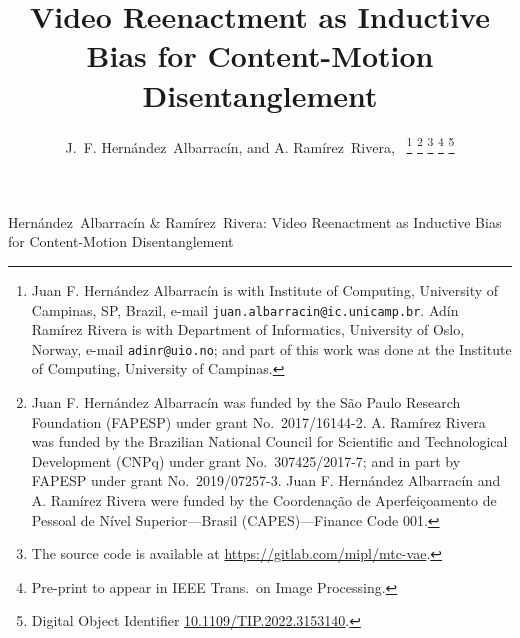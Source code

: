 \documentclass[journal]{IEEEtran}
\begin{document}
\title{Video Reenactment as Inductive Bias for Content-Motion Disentanglement}

\author{J.~F. Hernández~Albarracín,
        and A. Ramírez~Rivera,~%
\thanks{%
Juan F. Hernández Albarracín is with Institute of Computing, University of Campinas, SP, Brazil, e-mail \texttt{juan.albarracin@ic.unicamp.br}.  Adín Ramírez Rivera is with Department of Informatics, University of Oslo, Norway, e-mail \texttt{adinr@uio.no}; and part of this work was done at the Institute of Computing, University of Campinas.}%
\thanks{Juan F. Hernández Albarracín was funded by the São Paulo Research Foundation (FAPESP) under grant No.~2017/16144-2.  A. Ramírez Rivera was funded by the Brazilian National Council for Scientific and Technological Development (CNPq) under grant No.~307425/2017-7; and in part by FAPESP under grant No.~2019/07257-3. Juan F. Hernández Albarracín and A. Ramírez Rivera were funded by the Coordena\c{c}\~ao de Aperfei\c{c}oamento de Pessoal de N\'ivel Superior---Brasil (CAPES)---Finance Code 001.}%
\thanks{The source code is available at \url{https://gitlab.com/mipl/mtc-vae}.}
\thanks{Pre-print to appear in IEEE Trans.\ on Image Processing.}
\thanks{Digital Object Identifier \href{https://doi.org/10.1109/TIP.2022.3153140}{10.1109/TIP.2022.3153140}.}
}

%
{Hern\'andez~Albarrac\'{i}n \& Ram\'{i}rez~Rivera: Video Reenactment as Inductive Bias for Content-Motion Disentanglement}


\maketitle
\end{document}
